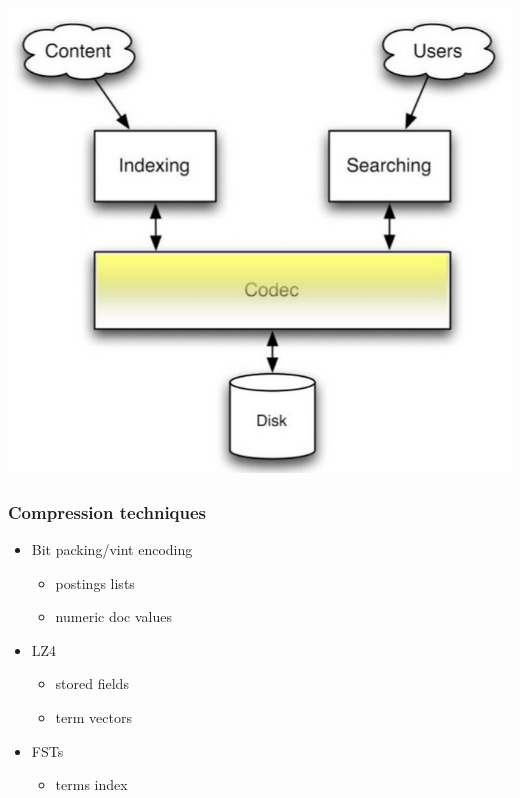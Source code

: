 \documentclass{beamer}
\begin{document}
	\begin{frame}
 		\includegraphics[keepaspectratio=true,height=.80\paperheight]{resources/codecAPI.png}
 	\end{frame}	
 	\begin{frame}
 		\frametitle{Compression techniques}
 		\begin{itemize}
 		\item Bit packing/vint encoding
 		\begin{itemize}
 		\item postings lists
 		\item numeric doc values
 		\end{itemize}
 		\item LZ4
 		\begin{itemize}
 		\item stored fields
 		\item term vectors
 		\end{itemize}
 		\item FSTs 
 		\begin{itemize}
 		\item terms index
 		\end{itemize}
 		\end{itemize}
 	\end{frame}
\end{document}

